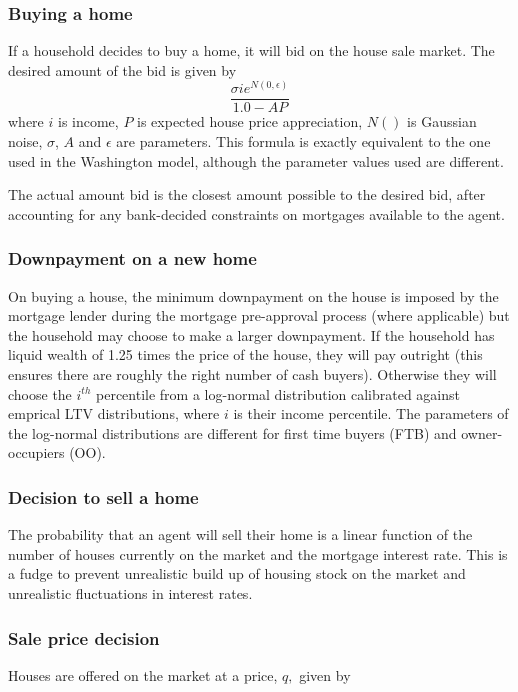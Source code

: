 \documentclass{article}
\begin{document}
\subsubsection{Buying a home}
\label{buyahome}
If a household decides to buy a home, it will bid on the house sale market. The desired amount of the bid is given by
\[
 \frac{\sigma i e^{N(0,\epsilon)}}{1.0 - AP}
\]
where $i$ is income, $P$ is expected house price appreciation, $N()$ is Gaussian noise, $\sigma$, $A$ and $\epsilon$ are parameters. This formula is exactly equivalent to the one used in the Washington model, although the parameter values used are different.

The actual amount bid is the closest amount possible to the desired bid, after accounting for any bank-decided constraints on mortgages available to the agent.

\subsubsection{Downpayment on a new home}
\label{downpayment}
On buying a house, the minimum downpayment on the house is imposed by the mortgage lender during the mortgage pre-approval process (where applicable) but the household may choose to make a larger downpayment. If the household has liquid wealth of 1.25 times the price of the house, they will pay outright (this ensures there are roughly the right number of cash buyers). Otherwise they will choose the $i^{th}$ percentile from a log-normal distribution calibrated against emprical LTV distributions, where $i$ is their income percentile. The parameters of the log-normal distributions are different for first time buyers (FTB) and owner-occupiers (OO).

\subsubsection{Decision to sell a home}
The probability that an agent will sell their home is a linear function of the number of houses currently on the market and the mortgage interest rate. This is a fudge to prevent unrealistic build up of housing stock on the market and unrealistic fluctuations in interest rates.

\subsubsection{Sale price decision}
\label{saleprice}
Houses are offered on the market at a price, $q,$ given by
\end{document}
